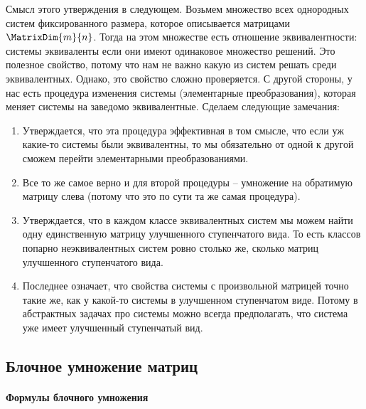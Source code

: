 Смысл этого утверждения в следующем.
Возьмем множество всех однородных систем фиксированного размера, которое описывается матрицами $\MatrixDim{m}{n}$.
Тогда на этом множестве есть отношение эквивалентности: системы эквиваленты если они имеют одинаковое множество решений.
Это полезное свойство, потому что нам не важно какую из систем решать среди эквивалентных.
Однако, это свойство сложно проверяется.
С другой стороны, у нас есть процедура изменения системы (элементарные преобразования), которая меняет системы на заведомо эквивалентные.
Сделаем следующие замечания:
\begin{enumerate}
\item Утверждается, что эта процедура эффективная в том смысле, что если уж какие-то системы были эквивалентны, то мы обязательно от одной к другой сможем перейти элементарными преобразованиями. 

\item Все то же самое верно и для второй процедуры -- умножение на обратимую матрицу слева (потому что это по сути та же самая процедура).

\item Утверждается, что в каждом классе эквивалентных систем мы можем найти одну единственную матрицу улучшенного ступенчатого вида.
То есть классов попарно неэквивалентных систем ровно столько же, сколько матриц улучшенного ступенчатого вида.

\item Последнее означает, что свойства системы с произвольной матрицей точно такие же, как у какой-то системы в улучшенном ступенчатом виде.
Потому в абстрактных задачах про системы можно всегда предполагать, что система уже имеет улучшенный ступенчатый вид.
\end{enumerate}


\subsection{Блочное умножение матриц}
\paragraph{Формулы блочного умножения}

